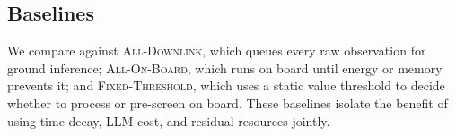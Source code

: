 \subsection{Baselines}
We compare against \textsc{All-Downlink}, which queues every raw observation for ground inference; \textsc{All-On-Board}, which runs on board until energy or memory prevents it; and \textsc{Fixed-Threshold}, which uses a static value threshold to decide whether to process or pre-screen on board. These baselines isolate the benefit of using time decay, LLM cost, and residual resources jointly.
